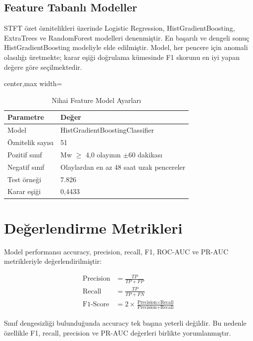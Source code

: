 \subsection{Feature Tabanlı Modeller}

STFT özet öznitelikleri üzerinde Logistic Regression, HistGradientBoosting, ExtraTrees ve RandomForest modelleri denenmiştir. En başarılı ve dengeli sonuç HistGradientBoosting modeliyle elde edilmiştir. Model, her pencere için anomali olasılığı üretmekte; karar eşiği doğrulama kümesinde F1 skorunu en iyi yapan değere göre seçilmektedir.

\begin{table}[htbp]
\centering
\small
\caption{Nihai Feature Model Ayarları}
\begin{adjustbox}{center,max width=\textwidth}
\begin{tabularx}{0.88\textwidth}{lX}
\toprule
\textbf{Parametre} & \textbf{Değer} \\
\midrule
Model & HistGradientBoostingClassifier \\
Öznitelik sayısı & 51 \\
Pozitif sınıf & Mw $\geq$ 4,0 olayının $\pm$60 dakikası \\
Negatif sınıf & Olaylardan en az 48 saat uzak pencereler \\
Test örneği & 7.826 \\
Karar eşiği & 0,4433 \\
\bottomrule
\end{tabularx}
\end{adjustbox}
\label{tab:hyperparams}
\end{table}

\section{Değerlendirme Metrikleri}

Model performansı accuracy, precision, recall, F1, ROC-AUC ve PR-AUC metrikleriyle değerlendirilmiştir:

\begin{align}
\text{Precision} &= \frac{TP}{TP + FP} \\
\text{Recall} &= \frac{TP}{TP + FN} \\
\text{F1-Score} &= 2 \times \frac{\text{Precision} \times \text{Recall}}{\text{Precision} + \text{Recall}}
\end{align}

Sınıf dengesizliği bulunduğunda accuracy tek başına yeterli değildir. Bu nedenle özellikle F1, recall, precision ve PR-AUC değerleri birlikte yorumlanmıştır.

